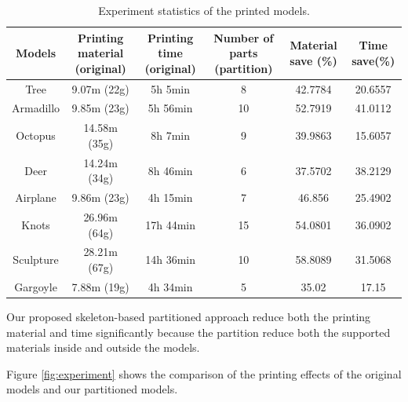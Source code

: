 \begin{table}[htb]

\begin{footnotesize}

\begin{center}

    \begin{tabular}{ cccccc }

    \hline

     Models& Printing material (original)& Printing time (original)& Number of parts (partition)& Material save (\%) &Time save(\%)\\ \hline
     Tree& 9.07m (22g)& 5h 5min & 8& 42.7784 &20.6557\\ \hline
     Armadillo& 9.85m (23g)& 5h 56min & 10& 52.7919 &41.0112\\ \hline
     Octopus& 14.58m (35g)& 8h 7min & 9& 39.9863 &15.6057\\ \hline
     Deer& 14.24m (34g)& 8h 46min & 6& 37.5702 &38.2129\\ \hline
     Airplane& 9.86m (23g)& 4h 15min & 7& 46.856 &25.4902\\ \hline 
     Knots& 26.96m (64g)& 17h 44min & 15& 54.0801 &36.0902\\ \hline
     Sculpture& 28.21m (67g)& 14h 36min & 10& 58.8089 &31.5068\\ \hline
     Gargoyle& 7.88m (19g)& 4h 34min & 5& 35.02 &17.15\\ \hline

  \hline

    \end{tabular}

\end{center}

\end{footnotesize}

\caption{Experiment statistics of the printed models.}\label{tab:ertms:summary}

\end{table}


Our proposed skeleton-based partitioned approach reduce both the printing material and time significantly because the partition reduce both the supported materials inside and outside the models.

Figure \ref{fig:experiment} shows the comparison of the printing effects of the original models and our partitioned models. 

